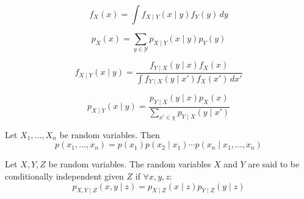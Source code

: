 \begin{ctheorem*}
  \[f_X(x) = \int f_{X \mid Y}(x \mid y) f_Y(y) \, dy\]
\end{ctheorem*}

\begin{dtheorem*}
  \[p_X(x) = \sum_{y \in \mathcal{Y}} p_{X \mid Y}(x \mid y)p_Y(y)\]
\end{dtheorem*}

\begin{ctheorem*}
  \[f_{X \mid Y}(x \mid y) = \frac{f_{Y \mid X}(y \mid x) f_X(x)}{\int f_{Y \mid X}(y \mid x') f_X(x') \, dx'}\]
\end{ctheorem*}

\begin{dtheorem*}
  \[p_{X \mid Y}(x \mid y) = \frac{p_{Y \mid X}(y \mid x) p_X(x)}{\sum_{x' \in \chi} p_{Y \mid X}(y \mid x')}\]
\end{dtheorem*}

\begin{theorem*}
  Let \(X_1, \ldots, X_n\) be random variables. Then
  \[p(x_1, \ldots, x_n) = p(x_1) p(x_2 \mid x_1) \cdots p(x_n \mid x_1, \ldots, x_n)\]
\end{theorem*}

\begin{theorem*}
  Let \(X, Y, Z\) be random variables. The random variables \(X\) and \(Y\) are said to be conditionally independent given \(Z\) if \(\forall x, y, z\):
  \vspace{-10pt}
  \[p_{X, Y \mid Z}(x, y \mid z) = p_{X \mid Z}(x \mid z) p_{Y \mid Z}(y \mid z)\]
\end{theorem*}

